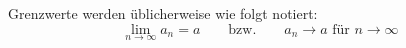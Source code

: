 Grenzwerte werden üblicherweise wie folgt notiert:
$$\lim_{n \to \infty} a_n = a \qquad \text{bzw.} \qquad a_n \rightarrow a \text{ für } n \to \infty$$